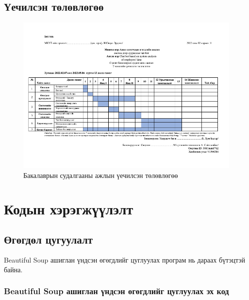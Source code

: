 
\appendix
{}

\section{Үечилсэн төлөвлөгөө}
\begin{figure}[h]
	\centering
	\includegraphics[width=16.5cm, angle=90]{images/plan.png}
	\caption{Бакалаврын судалгааны ажлын үечилсэн төлөвлөгөө}
	\label{fig:plan01}
	\end{figure}
\chapter{Кодын хэрэгжүүлэлт}

\section{Өгөгдөл цугуулалт}
Beautiful Soup ашиглан үндсэн өгөгдлийг цуглуулах програм нь дараах бүтэцтэй байна.
\begin{itemize}
\end{itemize}
\subsection{Beautiful Soup ашиглан үндсэн өгөгдлийг цуглуулах эх код}

